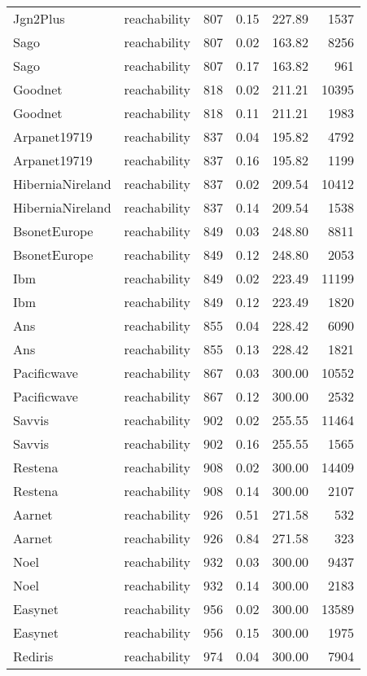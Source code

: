\begin{tabular}{llrrrr}
Jgn2Plus & reachability & 807 & 0.15 & 227.89 & 1537 \\
Sago & reachability & 807 & 0.02 & 163.82 & 8256 \\
Sago & reachability & 807 & 0.17 & 163.82 & 961 \\
Goodnet & reachability & 818 & 0.02 & 211.21 & 10395 \\
Goodnet & reachability & 818 & 0.11 & 211.21 & 1983 \\
Arpanet19719 & reachability & 837 & 0.04 & 195.82 & 4792 \\
Arpanet19719 & reachability & 837 & 0.16 & 195.82 & 1199 \\
HiberniaNireland & reachability & 837 & 0.02 & 209.54 & 10412 \\
HiberniaNireland & reachability & 837 & 0.14 & 209.54 & 1538 \\
BsonetEurope & reachability & 849 & 0.03 & 248.80 & 8811 \\
BsonetEurope & reachability & 849 & 0.12 & 248.80 & 2053 \\
Ibm & reachability & 849 & 0.02 & 223.49 & 11199 \\
Ibm & reachability & 849 & 0.12 & 223.49 & 1820 \\
Ans & reachability & 855 & 0.04 & 228.42 & 6090 \\
Ans & reachability & 855 & 0.13 & 228.42 & 1821 \\
Pacificwave & reachability & 867 & 0.03 & 300.00 & 10552 \\
Pacificwave & reachability & 867 & 0.12 & 300.00 & 2532 \\
Savvis & reachability & 902 & 0.02 & 255.55 & 11464 \\
Savvis & reachability & 902 & 0.16 & 255.55 & 1565 \\
Restena & reachability & 908 & 0.02 & 300.00 & 14409 \\
Restena & reachability & 908 & 0.14 & 300.00 & 2107 \\
Aarnet & reachability & 926 & 0.51 & 271.58 & 532 \\
Aarnet & reachability & 926 & 0.84 & 271.58 & 323 \\
Noel & reachability & 932 & 0.03 & 300.00 & 9437 \\
Noel & reachability & 932 & 0.14 & 300.00 & 2183 \\
Easynet & reachability & 956 & 0.02 & 300.00 & 13589 \\
Easynet & reachability & 956 & 0.15 & 300.00 & 1975 \\
Rediris & reachability & 974 & 0.04 & 300.00 & 7904 \\

\end{tabular}
